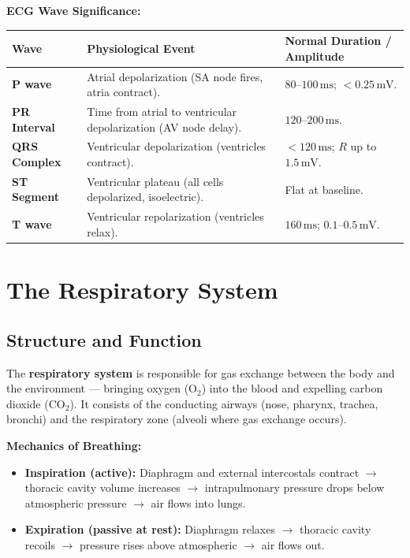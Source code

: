 \documentclass[12pt,a4paper]{article}
\begin{document}
\textbf{ECG Wave Significance:}\par\noindent
\begin{tabularx}{\linewidth}{|B{2.0cm}|Y|Y|}
\hline
\textbf{Wave} & \textbf{\color{myteal}Physiological Event} & \textbf{\color{myred}Normal Duration / Amplitude} \\
\hline
\textbf{P wave} & Atrial depolarization (SA node fires, atria contract). & $80$--$100\,\text{ms}$; $< 0.25\,\text{mV}$. \\
\hline
\textbf{PR Interval} & Time from atrial to ventricular depolarization (AV node delay). & $120$--$200\,\text{ms}$. \\
\hline
\textbf{QRS Complex} & Ventricular depolarization (ventricles contract). & $< 120\,\text{ms}$; $R$ up to $1.5\,\text{mV}$. \\
\hline
\textbf{ST Segment} & Ventricular plateau (all cells depolarized, isoelectric). & Flat at baseline. \\
\hline
\textbf{T wave} & Ventricular repolarization (ventricles relax). & $160\,\text{ms}$; $0.1$--$0.5\,\text{mV}$. \\
\hline
\end{tabularx}

\section{The Respiratory System}

\subsection{Structure and Function}

\begin{tcolorbox}[defbox, title={\textbf{Definition: Respiratory System}}]
The \textbf{respiratory system} is responsible for gas exchange between the body and the environment --- bringing oxygen ($\text{O}_2$) into the blood and expelling carbon dioxide ($\text{CO}_2$). It consists of the conducting airways (nose, pharynx, trachea, bronchi) and the respiratory zone (alveoli where gas exchange occurs).
\end{tcolorbox}

\textbf{Mechanics of Breathing:}
\begin{itemize}[leftmargin=*, itemsep=3pt]
  \item \textbf{Inspiration (active):} Diaphragm and external intercostals contract $\to$ thoracic cavity volume increases $\to$ intrapulmonary pressure drops below atmospheric pressure $\to$ air flows into lungs.
  \item \textbf{Expiration (passive at rest):} Diaphragm relaxes $\to$ thoracic cavity recoils $\to$ pressure rises above atmospheric $\to$ air flows out.
\end{itemize}
\end{document}
